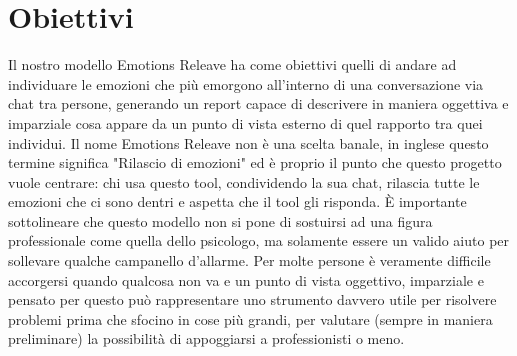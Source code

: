 \documentclass{article}
\begin{document}
\section{Obiettivi}\label{sec:obiettivi-daniele}
Il nostro modello Emotions Releave ha come obiettivi quelli di andare ad individuare le emozioni che più emorgono all'interno di una conversazione via chat tra persone, generando un report capace di descrivere in maniera oggettiva e imparziale cosa appare da un punto di vista esterno di quel rapporto tra quei individui.
Il nome Emotions Releave non è una scelta banale, in inglese questo termine significa "Rilascio di emozioni" ed è proprio il punto che questo progetto vuole centrare: chi usa questo tool, condividendo la sua chat, rilascia tutte le emozioni che ci sono dentri e aspetta che il tool gli risponda.
È importante sottolineare che questo modello non si pone di sostuirsi ad una figura professionale come quella dello psicologo, ma solamente essere un valido aiuto per sollevare qualche campanello d'allarme.
Per molte persone è veramente difficile accorgersi quando qualcosa non va e un punto di vista oggettivo, imparziale e pensato per questo può rappresentare uno strumento davvero utile per risolvere problemi prima che sfocino in cose più grandi, per valutare (sempre in maniera preliminare) la possibilità di appoggiarsi a professionisti o meno.
\end{document}
